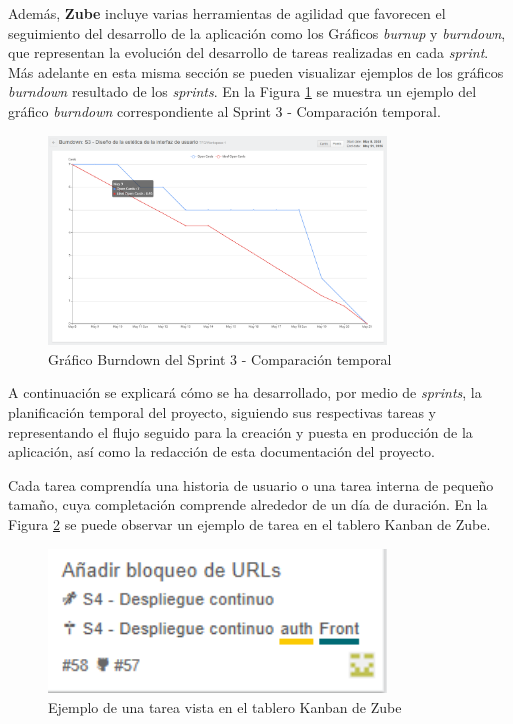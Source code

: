  Además, \textbf{Zube} incluye varias herramientas de agilidad que favorecen el seguimiento del desarrollo de la aplicación como los Gráficos \textit{burnup} y \textit{burndown}, que representan la evolución del desarrollo de tareas realizadas en cada \textit{sprint}. Más adelante en esta misma sección se pueden visualizar ejemplos de los gráficos \textit{burndown} resultado de los \textit{sprints}. En la Figura \ref{fig:BurndownS3} se muestra un ejemplo del gráfico \textit{burndown} correspondiente al Sprint 3 - Comparación temporal.
\begin{figure}[H]
\centering
\includegraphics[width=0.8\textwidth]{img/BurndownS3.png}
\caption{Gráfico Burndown del Sprint 3 - Comparación temporal}
\label{fig:BurndownS3}
\end{figure}

 A continuación se explicará cómo se ha desarrollado, por medio de \textit{sprints}, la planificación temporal del proyecto, siguiendo sus respectivas tareas y representando el flujo seguido para la creación y puesta en producción de la aplicación, así como la redacción de esta documentación del proyecto.

 Cada tarea comprendía una historia de usuario o una tarea interna de pequeño tamaño, cuya completación comprende alrededor de un día de duración. 
 En la Figura \ref{fig:Tarea57} se puede observar un ejemplo de tarea en el tablero Kanban de Zube.

\begin{figure}[H]
\centering
\includegraphics[width=0.8\textwidth]{img/Tarea57.png}
\caption{Ejemplo de una tarea vista en el tablero Kanban de Zube}
\label{fig:Tarea57}
\end{figure}
 
